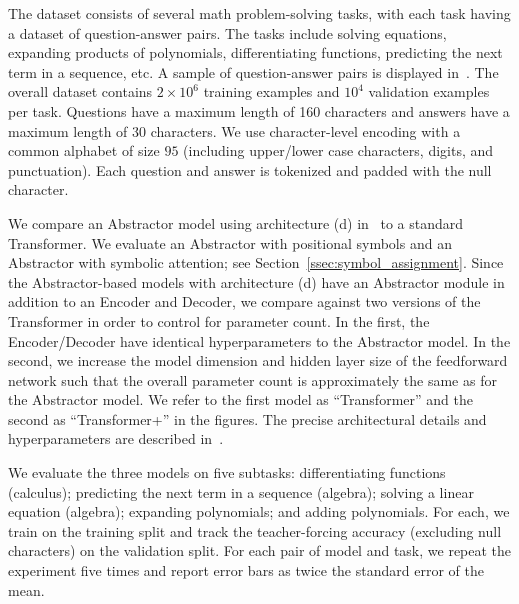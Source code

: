 The dataset consists of several math problem-solving tasks, with each task having a dataset of question-answer pairs. The tasks include solving equations, expanding products of polynomials, differentiating functions, predicting the next term in a sequence, etc. A sample of question-answer pairs is displayed in~. The overall dataset contains $2 \times 10^6$ training examples and $10^4$ validation examples per task. Questions have a maximum length of 160 characters and answers have a maximum length of 30 characters. We use character-level encoding with a common alphabet of size $95$ (including upper/lower case characters, digits, and punctuation). Each question and answer is tokenized and padded with the null character.

We compare an Abstractor model using architecture (d) in~ to a standard Transformer. We evaluate an Abstractor with positional symbols and an Abstractor with symbolic attention; 
see Section~\ref{ssec:symbol_assignment}. Since the Abstractor-based models with architecture (d) have an Abstractor module in addition to an Encoder and Decoder, we compare against two versions of the Transformer in order to control for parameter count. In the first, the Encoder/Decoder have identical hyperparameters to the Abstractor model. In the second, we increase the model dimension and hidden layer size of the feedforward network such that the overall parameter count is approximately the same as for the Abstractor model. We refer to the first model as ``Transformer'' and the second as ``Transformer+'' in the figures. %
The precise architectural details and hyperparameters are described in~.


We evaluate the three models on five subtasks: differentiating functions (calculus); predicting the next term in a sequence (algebra); solving a linear equation (algebra); expanding polynomials; and adding polynomials. For each, we train on the training split and track the teacher-forcing accuracy (excluding null characters) on the validation split. For each pair of model and task, we repeat the experiment five times and report error bars as twice the standard error of the mean.

